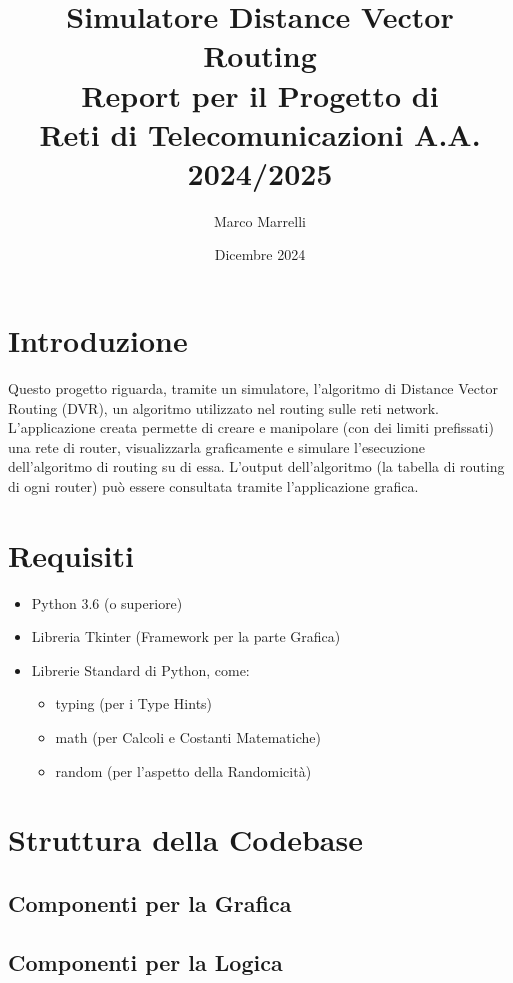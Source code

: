 \documentclass[a4paper,12pt]{report}
\title{Simulatore Distance Vector Routing\\Report per il Progetto di\\Reti di Telecomunicazioni A.A. 2024/2025}
\author{Marco Marrelli}
\date{Dicembre 2024}
\begin{document}
\maketitle

\renewcommand{\contentsname}{Indice}
\tableofcontents{}

\newpage
\section{Introduzione}
Questo progetto riguarda, tramite un simulatore, l'algoritmo di Distance Vector Routing (DVR), un algoritmo utilizzato nel routing sulle reti network.
L'applicazione creata permette di creare e manipolare (con dei limiti prefissati) una rete di router, visualizzarla graficamente e simulare l'esecuzione dell'algoritmo di routing su di essa.
L'output dell'algoritmo (la tabella di routing di ogni router) può essere consultata tramite l'applicazione grafica.

\section{Requisiti}
\begin{itemize}
    \item Python 3.6 (o superiore)
    \item Libreria Tkinter (Framework per la parte Grafica)
    \item Librerie Standard di Python, come:
    \begin{itemize}
        \item typing (per i Type Hints)
        \item math (per Calcoli e Costanti Matematiche)
        \item random (per l'aspetto della Randomicità)
    \end{itemize}
\end{itemize}

\newpage
\section{Struttura della Codebase}
\subsection{Componenti per la Grafica}
\subsection{Componenti per la Logica}
\end{document}
